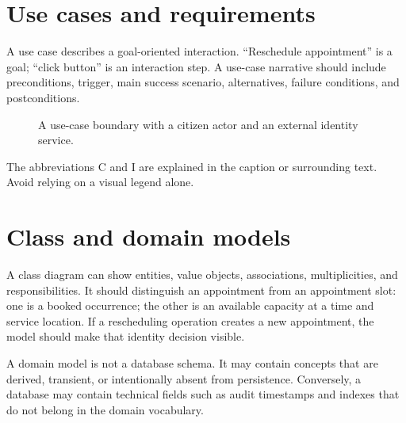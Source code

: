 \section{Use cases and requirements}
A use case describes a goal-oriented interaction. \enquote{Reschedule appointment} is a goal; \enquote{click button} is an interaction step. A use-case narrative should include preconditions, trigger, main success scenario, alternatives, failure conditions, and postconditions.

\begin{figure}[H]
\centering
{}
\caption{A use-case boundary with a citizen actor and an external identity service.}
\label{fig:usecase}
\end{figure}

The abbreviations C and I are explained in the caption or surrounding text. Avoid relying on a visual legend alone.

\section{Class and domain models}
A class diagram can show entities, value objects, associations, multiplicities, and responsibilities. It should distinguish an appointment from an appointment slot: one is a booked occurrence; the other is an available capacity at a time and service location. If a rescheduling operation creates a new appointment, the model should make that identity decision visible.

A domain model is not a database schema. It may contain concepts that are derived, transient, or intentionally absent from persistence. Conversely, a database may contain technical fields such as audit timestamps and indexes that do not belong in the domain vocabulary.

